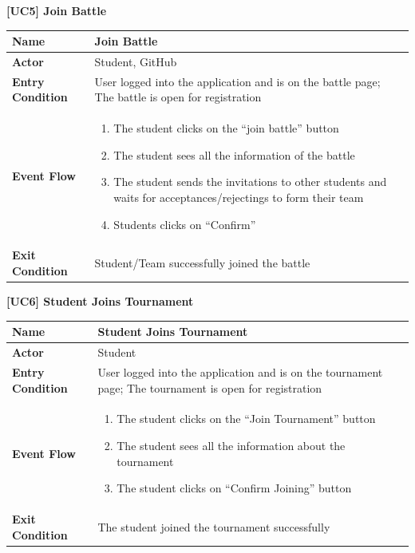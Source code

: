 \documentclass{article}
\begin{document}
\begin{table}
 \renewcommand{\arraystretch}{1.5}
    \centering
    \raggedright\textbf{[UC5] Join Battle}
    \begin{tabular}{|l|p{10cm}|}
        \hline
        \textbf{Name} & Join Battle \\
        \hline
        \textbf{Actor} & Student, GitHub \\
        \hline
        \textbf{Entry Condition} & User logged into the application and is on the battle page;
        The battle is open for registration \\
        \hline
        \textbf{Event Flow} & 
        \begin{enumerate}[align=left, topsep=0pt, partopsep=0pt]
             \item The student clicks on the “join battle” button
             \item The student sees all the information of the battle 
             \item The student sends the invitations to other students and waits for acceptances/rejectings to form their team
             \item Students clicks on “Confirm”
         \end{enumerate} \\
        \hline
        \textbf{Exit Condition} & Student/Team successfully joined the battle \\
        \hline
    \end{tabular}
\end{table}

\begin{table}
 \renewcommand{\arraystretch}{1.5}
    \centering
    \raggedright\textbf{[UC6] Student Joins Tournament}
    \begin{tabular}{|l|p{10cm}|}
        \hline
        \textbf{Name} & Student Joins Tournament \\
        \hline
        \textbf{Actor} & Student \\
        \hline
        \textbf{Entry Condition} & 
        User logged into the application and is on the tournament page; The tournament is open for registration  \\
        \hline
        \textbf{Event Flow} & 
        \begin{enumerate}[align=left, topsep=0pt, partopsep=0pt]
            \item The student clicks on the “Join Tournament” button 
            \item The student sees all the information about the tournament
            \item The student clicks on “Confirm Joining” button
        \end{enumerate} \\
        \hline
        \textbf{Exit Condition} & The student joined the tournament successfully  \\
        \hline
    \end{tabular}
\end{table}
\end{document}
